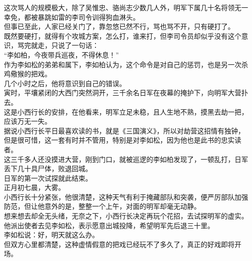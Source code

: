 \begin{multicols}{\theparacolNo}
这次骂人的规模极大，除了吴惟忠、骆尚志少数几人外，明军下属几十名将领无一幸免，都被暴跳如雷的李司令训得狗血淋头。\\

但事已至此，人家已经关门了，靠忽悠已然不行，骂也骂不开，只有硬打了。\\

既然要硬打，就得有个攻城方案，怎么打，谁来打，但李司令员却似乎没有这个意识，骂完就走，只说了一句话：\\

“李如柏，今夜带兵巡夜，不得休息！”\\

作为李如松的弟弟和属下，李如柏认为，这个命令是对自己的惩罚，也是另一次杀鸡儆猴的把戏。\\

几个小时之后，他将意识到自己的错误。\\

寅时，平壤紧闭的大西门突然洞开，三千余名日军在夜幕的掩护下，向明军大营扑去。\\

这是小西行长的安排，在他看来，明军立足未稳，且人生地不熟，摸黑去劫一把，应该万无一失。\\

据说小西行长平日最喜欢读的书，就是《三国演义》，所以对劫营这招情有独钟，但是很可惜，这一套有时并不管用，特别是对李如松，因为他也是此书的忠实读者。\\

这三千多人还没摸进大营，刚到门口，就被巡逻的李如柏发现了，一顿乱打，日军丢下几十具尸体，败退回城。\\

日军的第一次试探就此结束。\\

正月初七晨，大雾。\\

小西行长十分紧张，他很清楚，这种天气有利于掩藏部队和突袭，便严厉部队加强防范，但让他意外的是，整整一个上午，对面的明军却毫无动静。\\

想来想去却全无头绪，无奈之下，小西行长决定再玩个花招，去试探明军的虚实。\\

他派出使者去见李如松，表示愿意出城投降，希望明军先后退三十里。\\

李如松说：好，明天就这么办。\\

但双方心里都清楚，这种虚情假意的把戏已经玩不了多久了，真正的好戏即将开场。\\


\end{multicols}
